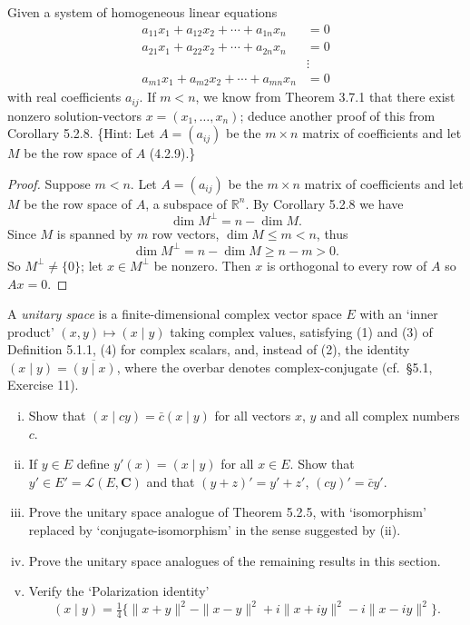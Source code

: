 \begin{tcolorbox}[title=Problem 9, breakable]
Given a system of homogeneous linear equations
\begin{align*}
    a_{11}x_1 + a_{12}x_2 + \cdots + a_{1n}x_n &= 0 \\
    a_{21}x_1 + a_{22}x_2 + \cdots + a_{2n}x_n &= 0 \\
    &\vdots \\
    a_{m1}x_1 + a_{m2}x_2 + \cdots + a_{mn}x_n &= 0
\end{align*}
with real coefficients $a_{ij}$. If $m < n$, we know from Theorem 3.7.1 that there exist nonzero solution-vectors $x = (x_1, \ldots, x_n)$; deduce another proof of this from Corollary 5.2.8. \{Hint: Let $A = (a_{ij})$ be the $m \times n$ matrix of coefficients and let $M$ be the row space of $A$ (4.2.9).\}
\end{tcolorbox}

\begin{proof}
    Suppose $m < n$.
    Let $A = (a_{ij})$ be the $m \times n$ matrix of coefficients and let $M$ be the row space of $A$, a subspace of $\mathbb{R}^n$.
    By Corollary 5.2.8 we have
    \[\dim M^\perp = n - \dim M.\]
    Since $M$ is spanned by $m$ row vectors, $\dim M \leq m < n$, thus
    \[\dim M^\perp = n - \dim M \geq n - m > 0.\]
    So $M^\perp \ne \{0\}$; let $x \in M^\perp$ be nonzero.
    Then $x$ is orthogonal to every row of $A$ so $Ax = 0$.
\end{proof}


\begin{tcolorbox}[title=Problem 10, breakable]
A \textit{unitary space} is a finite-dimensional complex vector space $E$ with an `inner product' $(x, y) \mapsto (x \mid y)$ taking complex values, satisfying (1) and (3) of Definition 5.1.1, (4) for complex scalars, and, instead of (2), the identity $(x \mid y) = \overline{(y \mid x)}$, where the overbar denotes complex-conjugate (cf.\ \S5.1, Exercise 11).
\begin{enumerate}[(i)]
    \item Show that $(x \mid cy) = \bar{c}(x \mid y)$ for all vectors $x$, $y$ and all complex numbers $c$.
    \item If $y \in E$ define $y'(x) = (x \mid y)$ for all $x \in E$. Show that $y' \in E' = \mathcal{L}(E, \mathbf{C})$ and that $(y + z)' = y' + z'$, $(cy)' = \bar{c}y'$.
    \item Prove the unitary space analogue of Theorem 5.2.5, with `isomorphism' replaced by `conjugate-isomorphism' in the sense suggested by (ii).
    \item Prove the unitary space analogues of the remaining results in this section.
    \item Verify the `Polarization identity'
    \[
        (x \mid y) = \tfrac{1}{4}\{\|x + y\|^2 - \|x - y\|^2 + i\|x + iy\|^2 - i\|x - iy\|^2\}.
    \]
\end{enumerate}
\end{tcolorbox}


